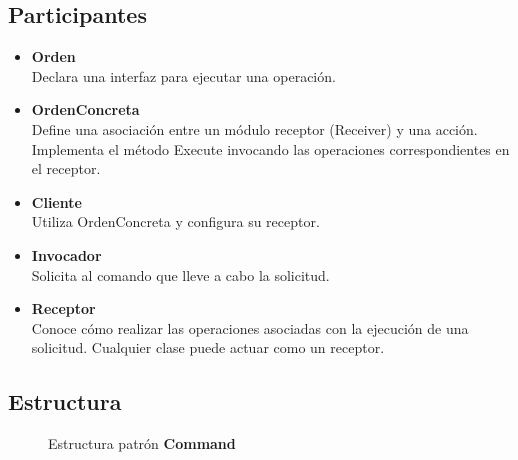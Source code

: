 \subsection*{Participantes}

\begin{itemize}
\item \textbf{Orden}\\
Declara una interfaz para ejecutar una operación.

\item \textbf{OrdenConcreta}\\
Define una asociación entre un módulo receptor (Receiver) y una acción.
Implementa el método Execute invocando las operaciones correspondientes en el receptor.

\item \textbf{Cliente}\\
Utiliza OrdenConcreta y configura su receptor.

\item \textbf{Invocador}\\
Solicita al comando que lleve a cabo la solicitud.

\item \textbf{Receptor}\\
Conoce cómo realizar las operaciones asociadas con la ejecución de una solicitud. Cualquier clase puede actuar como un receptor.
\end{itemize}


\subsection*{Estructura}

\begin{figure}[h]
\caption{Estructura patrón \textbf{Command}}
\begin{center}
\end{center}
\end{figure}


